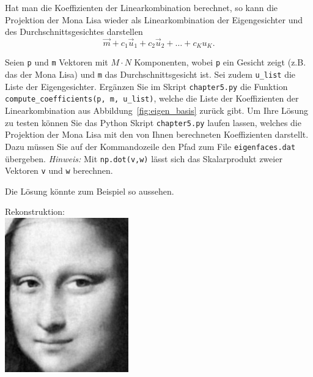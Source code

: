 Hat man die Koeffizienten der Linearkombination berechnet, so kann die Projektion der Mona Lisa wieder als Linearkombination der Eigengesichter und des Durchschnittsgesichtes darstellen
\begin{equation*}
	\vec m+c_1\vec u_1+c_2\vec u_2+\ldots+c_Ku_K.
\end{equation*}
\begin{aufgabe} \label{aufg:compute_coefficients}
	Seien \texttt{p} und \texttt{m} Vektoren mit $M\cdot N$ Komponenten, wobei \texttt{p} ein Gesicht zeigt (z.B. das der Mona Lisa) und \texttt{m} das Durchschnittsgesicht ist.
	Sei zudem \texttt{u\_list} die Liste der Eigengesichter.
	Ergänzen Sie im Skript \texttt{chapter5.py} die Funktion \texttt{compute\_coefficients(p, m, u\_list)}, welche die Liste der Koeffizienten der Linearkombination aus Abbildung~\ref{fig:eigen_basis} zurück gibt.
	Um Ihre Lösung zu testen können Sie das Python Skript \texttt{chapter5.py} laufen lassen, welches die Projektion der Mona Lisa mit den von Ihnen berechneten Koeffizienten darstellt.
	Dazu müssen Sie auf der Kommandozeile den Pfad zum File \texttt{eigenfaces.dat} übergeben.
	\textit{Hinweis:} Mit \texttt{np.dot(v,w)} lässt sich das Skalarprodukt zweier Vektoren \texttt{v} und \texttt{w} berechnen.
\end{aufgabe}
\begin{losung}
	Die Lösung könnte zum Beispiel so aussehen.\\[0.5cm]
	\begin{minipage}{0.65\textwidth}

	\end{minipage}\hfill
	\begin{minipage}{0.35\textwidth}\vspace{-1cm}
		\centering Rekonstruktion:\\[0.5cm]
		\includegraphics[width=0.4\textwidth]{images/eigenfaces/mona_lisa_eigen_approx}
	\end{minipage}
\end{losung}

